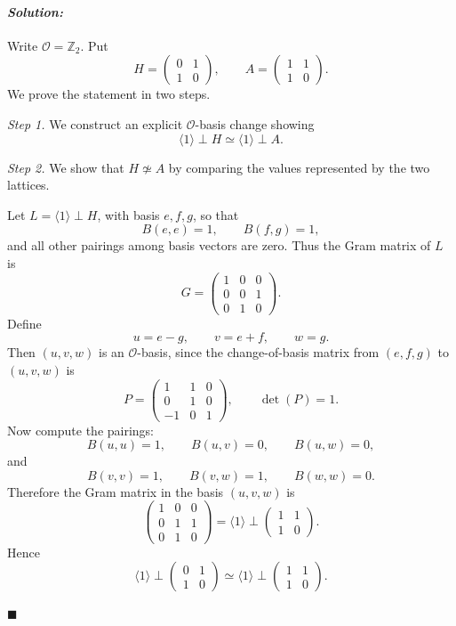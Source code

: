 \documentclass[12pt, a4paper]{article}
\newenvironment{solution}
  {\paragraph{\textit{Solution:}}\par\medskip}
  {\hfill$\blacksquare$\vspace{0.1cm}}
\begin{document}
\begin{solution}
Write \(\mathcal O=\mathbb Z_2\). Put
\[
H=
\begin{pmatrix}
0&1\\
1&0
\end{pmatrix},
\qquad
A=
\begin{pmatrix}
1&1\\
1&0
\end{pmatrix}.
\]
We prove the statement in two steps.

\emph{Step 1.} We construct an explicit \(\mathcal O\)-basis change showing
\[
\langle 1\rangle\perp H \simeq \langle 1\rangle\perp A.
\]

\emph{Step 2.} We show that \(H\not\simeq A\) by comparing the values represented
by the two lattices.

Let \(L=\langle 1\rangle\perp H\), with basis \(e,f,g\), so that
\[
B(e,e)=1,\qquad B(f,g)=1,
\]
and all other pairings among basis vectors are zero. Thus the Gram matrix of
\(L\) is
\[
G=
\begin{pmatrix}
1&0&0\\
0&0&1\\
0&1&0
\end{pmatrix}.
\]
Define
\[
u=e-g,\qquad v=e+f,\qquad w=g.
\]
Then \((u,v,w)\) is an \(\mathcal O\)-basis, since the change-of-basis matrix
from \((e,f,g)\) to \((u,v,w)\) is
\[
P=
\begin{pmatrix}
1&1&0\\
0&1&0\\
-1&0&1
\end{pmatrix},
\qquad \det(P)=1.
\]
Now compute the pairings:
\[
B(u,u)=1,\qquad B(u,v)=0,\qquad B(u,w)=0,
\]
and
\[
B(v,v)=1,\qquad B(v,w)=1,\qquad B(w,w)=0.
\]
Therefore the Gram matrix in the basis \((u,v,w)\) is
\[
\begin{pmatrix}
1&0&0\\
0&1&1\\
0&1&0
\end{pmatrix}
=
\langle 1\rangle\perp
\begin{pmatrix}
1&1\\
1&0
\end{pmatrix}.
\]
Hence
\[
\langle 1\rangle\perp
\begin{pmatrix}
0&1\\
1&0
\end{pmatrix}
\simeq
\langle 1\rangle\perp
\begin{pmatrix}
1&1\\
1&0
\end{pmatrix}.
\]


\end{solution}
\end{document}
